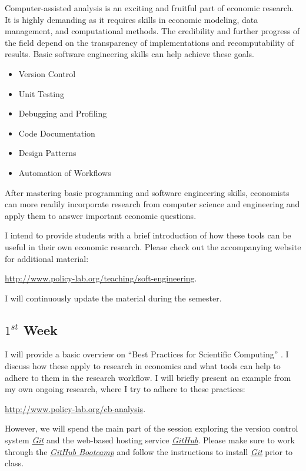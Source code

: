 



\doublespacing
\thispagestyle{empty}\vspace{-2.5cm}

\noindent Computer-assisted analysis is an exciting and fruitful part of economic research. It is highly demanding as it requires skills in economic modeling, data management, and computational methods. The credibility and further progress of the field depend on the transparency of implementations and recomputability of results. Basic software engineering skills can help achieve these goals.

\begin{itemize}
\item Version Control
\item Unit Testing
\item Debugging and Profiling
\item Code Documentation
\item Design Patterns
\item Automation of Workflows
\end{itemize}

\noindent After mastering basic programming and software engineering skills, economists can more readily incorporate research from computer science and engineering and apply them to answer important economic questions.\newline

\noindent I intend to provide students with a brief introduction of how these tools can be useful in their own economic research. Please check out the accompanying website for additional material:
\begin{center}
\url{http://www.policy-lab.org/teaching/soft-engineering}.
\end{center}
I will continuously update the material during the semester.
\subsection*{$1^{st}$ Week} 
I will provide a basic overview on ``Best Practices for Scientific Computing'' \citep{Wilson.2014}. I discuss how these apply to research in economics and what tools can help to adhere to them in the research workflow. I will briefly present an example from my own ongoing research, where I try to adhere to these practices: 
\begin{center}
\url{http://www.policy-lab.org/cb-analysis}.
\end{center}
However, we will spend the main part of the session exploring the version control system \href{http://git-scm.com/}{\textit{Git}} and the web-based hosting service \href{https://github.com/}{\textit{GitHub}}. Please make sure to work through the \href{https://help.github.com/categories/54/articles}{\textit{GitHub Bootcamp}} and follow the instructions to install \href{http://git-scm.com/}{\textit{Git}} prior to class.
